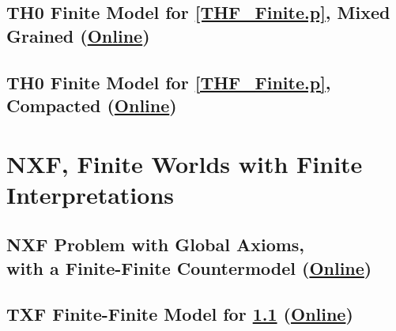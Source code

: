\documentclass{easychair}
\begin{document}
\begin{minipage}{\textwidth}
\subsection{TH0 Finite Model for \ref{THF_Finite.p}, Mixed Grained
(\href{https://raw.githubusercontent.com/GeoffsPapers/InterpretationFormat/master/Examples/THF_Finite_Medium.s}{Online})}
\label{THF_Finite_Medium.s}
\begin{small}

\end{small}
\end{minipage}

\begin{minipage}{\textwidth}
\subsection{TH0 Finite Model for \ref{THF_Finite.p}, Compacted
(\href{https://raw.githubusercontent.com/GeoffsPapers/InterpretationFormat/master/Examples/THF_Finite_Compact.s}{Online})}
\label{THF_Finite_Compact.s}
\begin{small}

\end{small}
\end{minipage}

\begin{minipage}{\textwidth}
\section{NXF, Finite Worlds with Finite Interpretations}
\label{NXF}

\subsection{NXF Problem with Global Axioms, \\ with a Finite-Finite Countermodel
(\href{https://raw.githubusercontent.com/GeoffsPapers/InterpretationFormat/master/Examples/NXF_Finite-Finite-Global.p}{Online})}
\label{NXF_Finite-Finite-Global.p}
\begin{small}

\end{small}
\end{minipage}

\begin{minipage}{\textwidth}
\subsection{TXF Finite-Finite Model for \ref{NXF_Finite-Finite-Global.p}
(\href{https://raw.githubusercontent.com/GeoffsPapers/InterpretationFormat/master/Examples/NXF_Finite-Finite-Global.s}{Online})}
\label{NXF_Finite-Finite-Global.s}
\begin{scriptsize}

\end{scriptsize}
\end{minipage}
\end{document}
